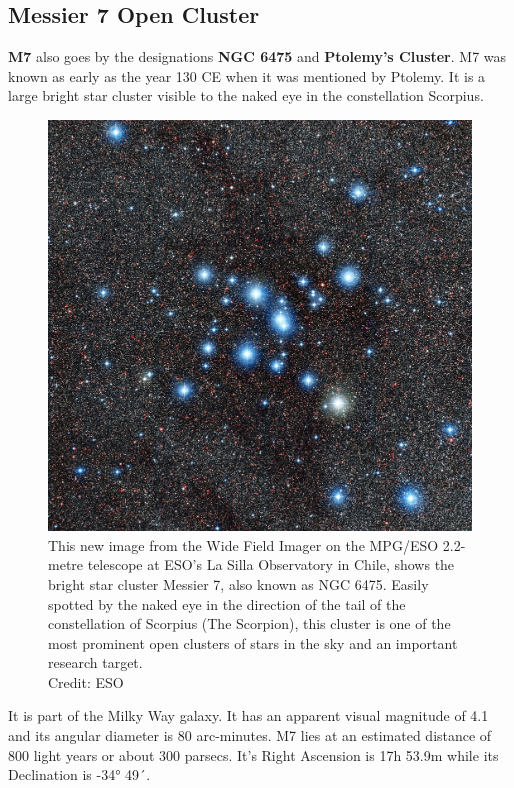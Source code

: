 \documentclass[12pt, twocolumn]{aastex62}
\begin{document}
\subsection{Messier 7 Open Cluster}
\textbf{M7} also goes by the designations \textbf{NGC 6475} and \textbf{Ptolemy's Cluster}. M7 was known as early as the year 130 CE when it was mentioned by Ptolemy. It is a large bright star cluster visible to the naked eye in the constellation Scorpius.
\begin{figure}
	\includegraphics[scale=0.2]{m7_eso_0}
	\caption{This new image from the Wide Field Imager on the MPG/ESO 2.2-metre telescope at ESO’s La Silla Observatory in Chile, shows the bright star cluster Messier 7, also known as NGC 6475. Easily spotted by the naked eye in the direction of the tail of the constellation of Scorpius (The Scorpion), this cluster is one of the most prominent open clusters of stars in the sky and an important research target. \cite{eso_m7}\\Credit: ESO}
	\label{fig: m7}
\end{figure}
It is part of the Milky Way galaxy. It has an apparent visual magnitude of 4.1 and its angular diameter is 80 arc-minutes. M7 lies at an estimated distance of 800 light years or about 300 parsecs. It's Right Ascension is 17h 53.9m while its Declination is -34° 49´\cite{astropixels_m7}.
\end{document}
